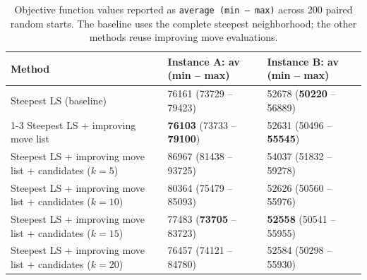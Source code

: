 \begin{table}[h!]
\centering
\footnotesize
\setlength{\tabcolsep}{3pt}
\renewcommand{\arraystretch}{1.5}
\caption{Objective function values reported as \texttt{average (min -- max)} across 200 paired random starts. The baseline uses the complete steepest neighborhood; the other methods reuse improving move evaluations.}
\label{tab:task5_obj}
\vspace{0.5em}
\begin{tabularx}{\textwidth}{p{7.2cm} X X}
\toprule
\textbf{Method} & \textbf{Instance A: av (min -- max)} & \textbf{Instance B: av (min -- max)} \\
\midrule
Steepest LS (baseline) & 76161 (73729 -- 79423) & 52678 (\textbf{50220} -- 56889) \\
\cmidrule{1-3}
Steepest LS + improving move list & \textbf{76103} (73733 -- \textbf{79100}) & 52631 (50496 -- \textbf{55545}) \\
Steepest LS + improving move list + candidates ($k = 5$) & 86967 (81438 -- 93725) & 54037 (51832 -- 59278) \\
Steepest LS + improving move list + candidates ($k = 10$) & 80364 (75479 -- 85093) & 52626 (50560 -- 55976) \\
Steepest LS + improving move list + candidates ($k = 15$) & 77483 (\textbf{73705} -- 83723) & \textbf{52558} (50541 -- 55955) \\
Steepest LS + improving move list + candidates ($k = 20$) & 76457 (74121 -- 84780) & 52584 (50298 -- 55930) \\
\bottomrule
\end{tabularx}
\end{table}

